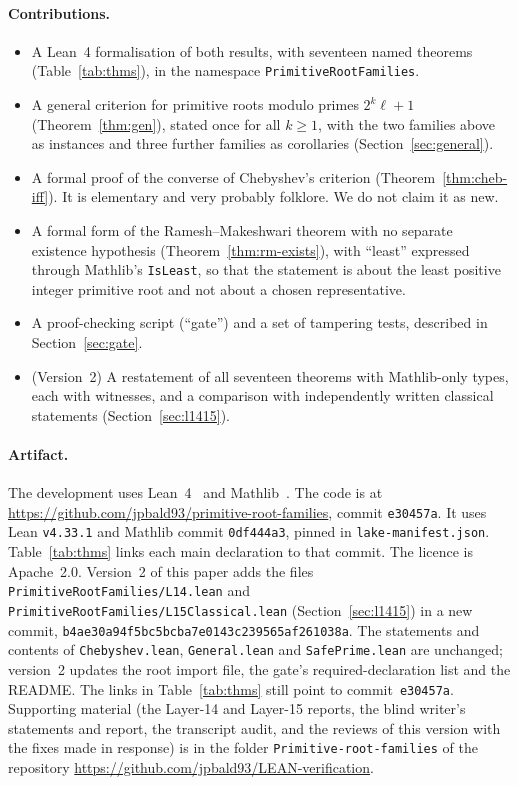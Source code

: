 \documentclass[11pt]{article}
\theoremstyle{remark}
\newcommand{\lean}[1]{\texttt{#1}}
\newcommand{\repo}{https://github.com/jpbald93/primitive-root-families}
\newcommand{\commit}{e30457a}
\begin{document}
\paragraph{Contributions.}
\begin{itemize}
\item A Lean~4 formalisation of both results, with seventeen named theorems (Table~\ref{tab:thms}), in the
namespace \lean{PrimitiveRootFamilies}.
\item A general criterion for primitive roots modulo primes $2^k\ell+1$
(Theorem~\ref{thm:gen}), stated once for all $k\geq1$, with the two families above as instances and
three further families as corollaries (Section~\ref{sec:general}).
\item A formal proof of the converse of Chebyshev's criterion
(Theorem~\ref{thm:cheb-iff}). It is elementary and very probably folklore. We do not claim it as new.
\item A formal form of the Ramesh--Makeshwari theorem with no separate existence hypothesis
(Theorem~\ref{thm:rm-exists}), with ``least'' expressed through Mathlib's \lean{IsLeast}, so
that the statement is about the least positive integer primitive root and not about a chosen
representative.
\item A proof-checking script (``gate'') and a set of tampering tests, described in
Section~\ref{sec:gate}.
\item (Version~2) A restatement of all seventeen theorems with Mathlib-only types, each with witnesses,
and a comparison with independently written classical statements (Section~\ref{sec:l1415}).
\end{itemize}

\paragraph{Artifact.} The development uses Lean~4~\cite{Lean4} and Mathlib~\cite{Mathlib}. The code is at \url{\repo}, commit \texttt{\commit}. It uses Lean
\texttt{v4.33.1} and Mathlib commit \texttt{0df444a3}, pinned in \texttt{lake-manifest.json}. Table~\ref{tab:thms} links each main declaration to that commit. The licence is Apache~2.0.
Version~2 of this paper adds the files \lean{PrimitiveRootFamilies/L14.lean} and
\lean{PrimitiveRootFamilies/L15Classical.lean} (Section~\ref{sec:l1415}) in a new commit,
\texttt{b4ae30a94f5bc5bcba7e0143c239565af261038a}. The statements and contents of \lean{Chebyshev.lean}, \lean{General.lean} and
\lean{SafePrime.lean} are unchanged; version~2 updates the root import file, the gate's
required-declaration list and the README. The links in
Table~\ref{tab:thms} still point to commit~\texttt{\commit}.
Supporting material (the Layer-14 and Layer-15 reports, the blind writer's statements and report, the transcript audit, and the reviews of this version with the fixes made in response) is in the folder \texttt{Primitive-root-families} of the repository \url{https://github.com/jpbald93/LEAN-verification}.
\end{document}
